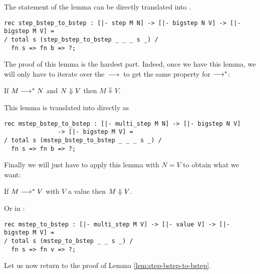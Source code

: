 The statement of the lemma can be directly translated into \beluga.

\begin{lstlisting}
rec step_bstep_to_bstep : [|- step M N] -> [|- bigstep N V] -> [|- bigstep M V] =
/ total s (step_bstep_to_bstep _ _ _ s _) /
  fn s => fn b => ?;
\end{lstlisting}

The proof of this lemma is the hardest part. Indeed, once we have this lemma, we will only
have to iterate over the $\mathrel{\,\longrightarrow\,}$ to get the same property for $\longrightarrow^*$:

\begin{lemma}\label{lem:mstep-bstep-to-bstep}
  If $M \longrightarrow^* N$ and $N \Downarrow V$ then $M \Downarrow V$.
\end{lemma}

This lemma is translated into \beluga directly as

  \begin{lstlisting}
rec mstep_bstep_to_bstep : [|- multi_step M N] -> [|- bigstep N V]
			   -> [|- bigstep M V] =
/ total s (mstep_bstep_to_bstep _ _ _ s _) /
  fn s => fn b => ?;
  \end{lstlisting}

Finally we will just have to apply this lemma with $N = V$ to obtain what we
want:

\begin{proposition}\label{prop:mstep-to-bstep}
  If $M \longrightarrow^* V$ with $V$ a value then $M \Downarrow V$.
\end{proposition}

Or in \beluga:

\begin{lstlisting}
rec mstep_to_bstep : [|- multi_step M V] -> [|- value V] -> [|- bigstep M V] =
/ total s (mstep_to_bstep _ _ s _) /
  fn s => fn v => ?;
\end{lstlisting}


Let us now return to the proof of Lemma \ref{lem:step-bstep-to-bstep}.

